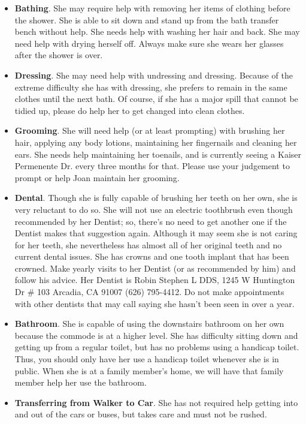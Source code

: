 \documentclass[]{article}
\begin{document}
\begin{itemize}
\item \textbf{Bathing}. She may require help with removing her items of clothing before the shower. She is able to sit down and stand up from the bath transfer bench without help. She needs help with washing her hair and back. She may need help with drying herself off. Always make sure she wears her glasses after the shower is over.
\item \textbf{Dressing}. She may need help with undressing and dressing. Because of the extreme difficulty she has with dressing, she prefers to remain in the same clothes until the next bath. Of course, if she has a major spill that cannot be tidied up, please do help her to get changed into clean clothes.
\item \textbf{Grooming}. She will need help (or at least prompting) with brushing her hair, applying any body lotions, maintaining her fingernails and cleaning her ears. She needs help maintaining her toenails, and is currently seeing a Kaiser Permenente Dr. every three months for that. Please use your judgement to prompt or help Joan maintain her grooming.
\item \textbf{Dental}. Though she is fully capable of brushing her teeth on her own, she is very reluctant to do so. She will not use an electric toothbrush even though recommended by her Dentist; so, there's no need to get another one if the Dentist makes that suggestion again. Although it may seem she is not caring for her teeth, she nevertheless has almost all of her original teeth and no current dental issues. She has crowns and one tooth implant that has been crowned. Make yearly visits to her Dentist (or as recommended by him) and follow his advice. Her Dentist is Robin Stephen L DDS, 1245 W Huntington Dr # 103 Arcadia, CA 91007 (626) 795-4412. Do not make appointments with other dentists that may call saying she hasn't been seen in over a year.
\item \textbf{Bathroom}. She is capable of using the downstairs bathroom on her own because the commode is at a higher level. She has difficulty sitting down and getting up from a regular toilet, but has no problems using a handicap toilet. Thus, you should only have her use a handicap toilet whenever she is in public. When she is at a family member's home, we will have that family member help her use the bathroom.
\item \textbf{Transferring from Walker to Car}. She has not required help getting into and out of the cars or buses, but takes care and must not be rushed.

\end{itemize}
\end{document}

